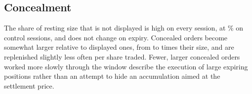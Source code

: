 

\subsection{Concealment}

The share of resting size that is not displayed is high on every session, at
\ConcealedDepthShareControl{}\% on control sessions, and does not change on expiry. Concealed
orders become somewhat larger relative to displayed ones, from \ConcealedSizeMultipleControl{}
to \ConcealedSizeMultipleExpiry{} times their size, and are replenished slightly less often per share
traded. Fewer, larger concealed orders worked more slowly through the window describe the
execution of large expiring positions rather than an attempt to hide an accumulation aimed at
the settlement price.

